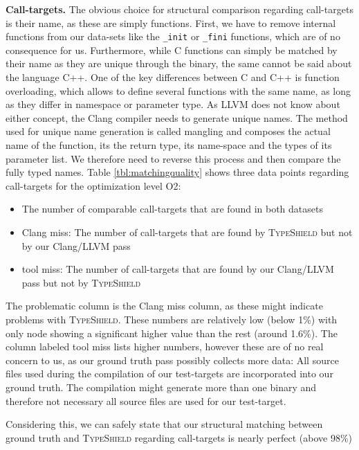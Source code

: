 \textbf{Call-targets.} The obvious choice for structural comparison regarding call-targets is their name, as these are simply functions. 
First, we have to remove internal functions from our data-sets like the \texttt{\_init} or \texttt{\_fini} functions, which are of no consequence for us. 
Furthermore, while C functions can simply be matched by their name as they are unique through the binary, the same cannot be said about the 
language C++. One of the key differences between C and C++ is function overloading, which allows to define several functions with the same name, as 
long as they differ in namespace or parameter type. As LLVM does not know about either concept, the Clang compiler needs to generate unique names. 
The method used for unique name generation is called mangling and composes the actual name of the function, its the return type, its name-space and the 
types of its parameter list. We therefore need to reverse this process and then compare the fully typed names.
Table \ref{tbl:matchingquality} shows three data points regarding call-targets for the optimization level O2:
\begin{itemize}
\item The number of comparable call-targets that are found in both datasets
\item Clang miss: The number of call-targets that are found by \textsc{TypeShield} but not by our Clang/LLVM pass
\item tool miss: The number of call-targets that are found by our Clang/LLVM pass but not by \textsc{TypeShield}
\end{itemize}
The problematic column is the Clang miss column, as these might indicate problems with \textsc{TypeShield}. These numbers are relatively low (below 1\%) with only node showing a significant higher value than the rest (around 1.6\%). The column labeled tool miss lists 
higher numbers, however these are of no real concern to us, as our ground truth pass possibly collects more data: All source files used during the 
compilation of our test-targets are incorporated into our ground truth. The compilation might generate more than one binary and therefore not 
necessary all source files are used for our test-target.

Considering this, we can safely state that our structural matching between ground truth and \textsc{TypeShield} regarding call-targets is nearly
perfect (above 98\%)\\


